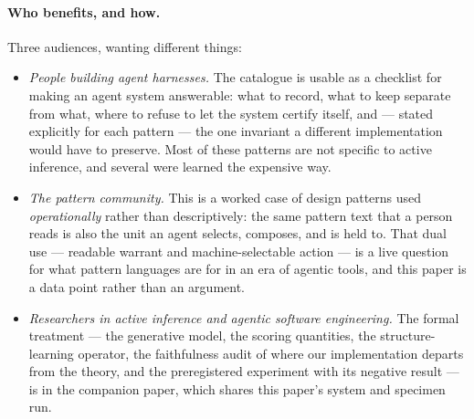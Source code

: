 \paragraph{Who benefits, and how.}  Three audiences, wanting different things:

\begin{itemize}\tightlist
\item \emph{People building agent harnesses.}  The catalogue is usable as a
  checklist for making an agent system answerable: what to record, what to keep
  separate from what, where to refuse to let the system certify itself, and ---
  stated explicitly for each pattern --- the one invariant a different
  implementation would have to preserve.  Most of these patterns are not
  specific to active inference, and several were learned the expensive way.
\item \emph{The pattern community.}  This is a worked case of design patterns
  used \emph{operationally} rather than descriptively: the same pattern text
  that a person reads is also the unit an agent selects, composes, and is held
  to.  That dual use --- readable warrant and machine-selectable action --- is a
  live question for what pattern languages are for in an era of agentic tools,
  and this paper is a data point rather than an argument.
\item \emph{Researchers in active inference and agentic software engineering.}
  The formal treatment --- the generative model, the scoring quantities, the
  structure-learning operator, the faithfulness audit of where our
  implementation departs from the theory, and the preregistered experiment with
  its negative result --- is in the companion paper, which shares this paper's
  system and specimen run.
\end{itemize}

